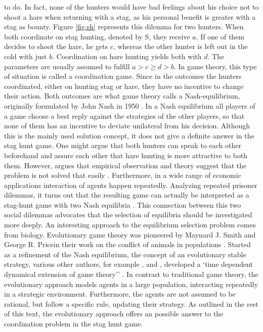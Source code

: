 to do. In fact, none of the hunters would have bad feelings about his choice
not to shoot a hare when returning with a stag, as his personal benefit is 
greater with a stag as bounty. Figure \ref{fig:sh} represents this dilemma 
for two hunters. When both coordinate on stag hunting, denoted by S, they receive 
$a$. If one of them decides to shoot the hare, he gets $c$, whereas
the other hunter is left out in the cold with just $b$. Coordination on hare
hunting yields both with $d$. The parameters are usually assumed to fulfill
$a > c \geq d >b$. In game theory, this type of situation is called
a coordination game. Since in the outcomes the hunters coordinated, either
on hunting stag or hare, they have no incentive to change their action. 
Both outcomes are what game theory calls a Nash-equilibrium, originally
formulated by John Nash in 1950 \parencite{nash_equilibrium_1950}. In a 
Nash equilibrium all players of a game choose a best reply against
the strategies of the other players, so that none of them has an incentive
to deviate unilateral from his decision. Although this is the mainly used
solution concept, it does not give a definite answer in the stag hunt game.
One might argue that both hunters can speak to each other beforehand and
assure each other that hare hunting is more attractive to both them. However,
argues that empirical observation and theory suggest that the problem is 
not solved that easily \parencite[337]{camerer_behavioral_2003}. 
Furthermore, in a wide range of economic applications interaction of agents
happen repeatedly. Analyzing repeated prisoner dilemmas, it turns 
out that the resulting game can actually be interpreted as a stag-hunt game with
two Nash equilibria \parencite{skyrms_stag_2004}.
This connection between this two social dilemmas advocates that
the selection of equilibria should be investigated more deeply. 
An interesting approach to the equilibrium selection problem comes from
biology. Evolutionary game theory was pioneered by Maynard J. Smith and George
R. Pricein their work on the conflict of animals in populations 
\parencite{smith_lhe_1973}. Started as a refinement of the Nash equilibrium,
the concept of an evolutionary stable strategy, various other authors, for 
example \textcite{taylor_evolutionary_1978}, \textcite{hofbauer_note_1979} and
\textcite{zeeman_dynamics_1981}, developed a `time dependent dynamical
extension of game theory'' \parencite[55]{hanauske_evolutionare_2011}.
In contrast to traditional game theory, the evolutionary approach  models
 agents in a large population, interacting repeatedly in a strategic environment. 
Furthermore, the agents are not assumed to be rational, but follow a specific 
rule, updating their strategy. 
As outlined in the rest of this text, the
evolutionary approach offers an possible answer to the coordination
problem in the stag hunt game.

